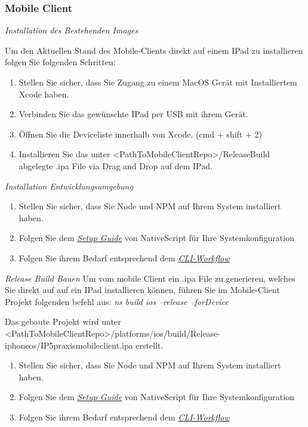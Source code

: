 \subsubsection*{Mobile Client}
\textit{Installation des Bestehenden Images}

Um den Aktuellen Stand des Mobile-Clients direkt auf einem IPad zu installieren folgen Sie folgenden Schritten:
\begin{enumerate}
    \item Stellen Sie sicher, dass Sie Zugang zu einem MacOS Gerät mit Installiertem Xcode haben.
    \item Verbinden Sie das gewünschte IPad per USB mit ihrem Gerät.
    \item Öffnen Sie die Deviceliste innerhalb von Xcode. (cmd + shift + 2)
    \item Installieren Sie das unter \textless PathToMobileClientRepo\textgreater /ReleaseBuild abgelegte .ipa File via Drag and Drop auf dem IPad.
\end{enumerate}

\textit{Installation Entwicklungsumgebung}
\begin{enumerate}
    \item Stellen Sie sicher, dass Sie Node und NPM auf Ihrem System installiert haben.
    \item Folgen Sie dem \href{https://docs.nativescript.org/environment-setup.html}{\textit{Setup Guide}} von NativeScript für Ihre Systemkonfiguration \cite{ns-envSetup}
    \item Folgen Sie ihrem Bedarf entsprechend dem \href{https://docs.nativescript.org/development-workflow.html}{\textit{CLI-Workflow}}\cite{ns-cli}
\end{enumerate}

\textit{Release Build Bauen}
Um vom mobile Client ein .ipa File zu generieren, welches Sie direkt auf auf ein IPad installieren können, führen Sie im
Mobile-Client Projekt folgenden befehl aus: \textit{ns build ios --release --forDevice}

Das gebaute Projekt wird unter  \textless PathToMobileClientRepo\textgreater /platforms/ios/build/Release-iphoneos/IP5praxismobileclient.ipa erstellt.
\begin{enumerate}
    \item Stellen Sie sicher, dass Sie Node und NPM auf Ihrem System installiert haben.
    \item Folgen Sie dem \href{https://docs.nativescript.org/environment-setup.html}{\textit{Setup Guide}} von NativeScript für Ihre Systemkonfiguration \cite{ns-envSetup}
    \item Folgen Sie ihrem Bedarf entsprechend dem \href{https://docs.nativescript.org/development-workflow.html}{\textit{CLI-Workflow}}\cite{ns-cli}
\end{enumerate}


